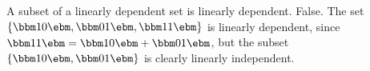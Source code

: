 {A subset of a linearly dependent set is linearly dependent.}
{False. The set $\left\{\bbm 1\\0\ebm, \bbm 0\\1\ebm, \bbm 1\\1\ebm\right\}$ is linearly dependent, since $\bbm 1\\1\ebm = \bbm 1\\0\ebm+\bbm 0\\1\ebm$, but the subset $\left\{\bbm 1\\0\ebm,\bbm 0\\1\ebm\right\}$ is clearly linearly independent.}